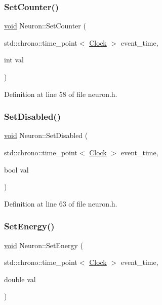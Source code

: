 \subsubsection{\texorpdfstring{Set\+Counter()}{SetCounter()}}
{\footnotesize\ttfamily \mbox{\hyperlink{glad_8h_a950fc91edb4504f62f1c577bf4727c29}{void}} Neuron\+::\+Set\+Counter (\begin{DoxyParamCaption}\item[{std\+::chrono\+::time\+\_\+point$<$ \mbox{\hyperlink{universe_8h_a0ef8d951d1ca5ab3cfaf7ab4c7a6fd80}{Clock}} $>$}]{event\+\_\+time,  }\item[{int}]{val }\end{DoxyParamCaption})\hspace{0.3cm}{\ttfamily [inline]}}



Definition at line 58 of file neuron.\+h.

\mbox{\label{class_neuron_af9ad96e27f7692e9e328d90e4c96977a}} 
\subsubsection{\texorpdfstring{Set\+Disabled()}{SetDisabled()}}
{\footnotesize\ttfamily \mbox{\hyperlink{glad_8h_a950fc91edb4504f62f1c577bf4727c29}{void}} Neuron\+::\+Set\+Disabled (\begin{DoxyParamCaption}\item[{std\+::chrono\+::time\+\_\+point$<$ \mbox{\hyperlink{universe_8h_a0ef8d951d1ca5ab3cfaf7ab4c7a6fd80}{Clock}} $>$}]{event\+\_\+time,  }\item[{bool}]{val }\end{DoxyParamCaption})\hspace{0.3cm}{\ttfamily [inline]}}



Definition at line 63 of file neuron.\+h.

\mbox{\label{class_neuron_a5efa690ce4d8ff2f8dfb1fbfd84c5279}} 
\subsubsection{\texorpdfstring{Set\+Energy()}{SetEnergy()}}
{\footnotesize\ttfamily \mbox{\hyperlink{glad_8h_a950fc91edb4504f62f1c577bf4727c29}{void}} Neuron\+::\+Set\+Energy (\begin{DoxyParamCaption}\item[{std\+::chrono\+::time\+\_\+point$<$ \mbox{\hyperlink{universe_8h_a0ef8d951d1ca5ab3cfaf7ab4c7a6fd80}{Clock}} $>$}]{event\+\_\+time,  }\item[{double}]{val }\end{DoxyParamCaption})\hspace{0.3cm}{\ttfamily [inline]}}



